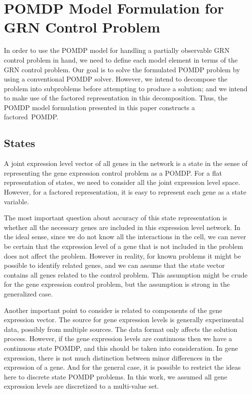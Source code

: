 \chapter{POMDP Model Formulation for GRN Control Problem}
\label{chapter:formulation}

In order to use the POMDP model for handling a partially observable GRN control problem in hand, we need to
define each model element in terms of the GRN control problem. Our goal is to solve the formulated POMDP
problem by using a conventional POMDP solver. However, we intend to decompose the problem into subproblems
before attempting to produce a solution; and we intend to make use of the factored representation in this
decomposition. Thus, the POMDP model formulation presented in this paper constructs a factored~POMDP.

\section{States}
A joint expression level vector of all genes in the network is a state in the sense of representing the gene
expression control problem as a POMDP. For a flat representation of states, we need to consider all the joint
expression level space. However, for a factored representation, it is easy to represent each gene as a state
variable.

The most important question about accuracy of this state representation is whether all the necessary genes
are included in this expression level network. In the ideal sense, since we do not know all the interactions
in the cell, we can never be certain that the expression level of a gene that is not included in the problem
does not affect the problem. However in reality, for known problems it might be possible to identify related
genes, and we can assume that the state vector contains all genes related to the control problem. This
assumption might be crude for the gene expression control problem, but the assumption is strong in the
generalized case.

Another important point to consider is related to components of the gene expression vector. The source for
gene expression levels is generally experimental data, possibly from multiple sources. The data format only
affects the solution process. However, if the gene expression levels are continuous then we have a continuous
state POMDP, and this should be taken into consideration. In gene expression, there is not much distinction
between minor differences in the expression of a gene. And for the general case, it is possible to restrict
the ideas here to discrete state POMDP problems. In this work, we assumed all gene expression levels are
discretized to a multi-value set.

